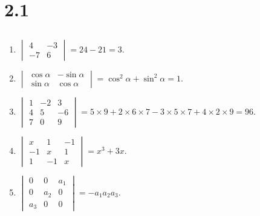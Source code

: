 \section{2.1}


\subsection{} %


	\paragraph{} %
		\begin{enumerate}
			\item %
			      $\begin{vmatrix}
					      4  & -3 \\
					      -7 & 6
				      \end{vmatrix} = 24 - 21 = 3$.

			\item %
			      $\begin{vmatrix}
					      \cos\alpha & -\sin\alpha \\
					      \sin\alpha & \cos\alpha
				      \end{vmatrix} = \cos^2\alpha + \sin^2\alpha = 1$.

			\item %
			      $\begin{vmatrix}
					      1 & -2 & 3  \\
					      4 & 5  & -6 \\
					      7 & 0  & 9
				      \end{vmatrix} = 5 \times 9 + 2 \times 6 \times 7 - 3 \times 5 \times 7 + 4 \times 2 \times 9 = 96$.

			\item %
			      $\begin{vmatrix}
					      x  & 1  & -1 \\
					      -1 & x  & 1  \\
					      1  & -1 & x
				      \end{vmatrix} = x^3 + 3x$.

			\item %
			      $\begin{vmatrix}
					      0   & 0   & a_1 \\
					      0   & a_2 & 0   \\
					      a_3 & 0   & 0
				      \end{vmatrix} = -a_1a_2a_3$.
		\end{enumerate}


